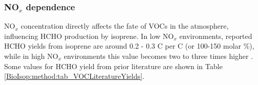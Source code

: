       
      
    
      
      
      
    \subsubsection{NO$_x$ dependence}
    
      NO$_x$ concentration directly affects the fate of VOCs in the atmosphere, influencing HCHO production by isoprene.
      In low NO$_x$ environments, reported HCHO yields from isoprene are around 0.2 - 0.3 C per C (or 100-150 molar \%), while in high NO$_x$ environments this value becomes two to three times higher \parencite{Palmer2003, Wolfe2016}.
      Some values for HCHO yield from prior literature are shown in Table \ref{BioIsop:method:tab_VOCLiteratureYields}.
      
      
